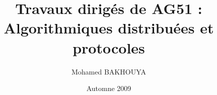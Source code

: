 \documentclass[a4paper]{report}
\title{Travaux dirigés de AG51 : Algorithmiques distribuées et protocoles}
\author{Mohamed BAKHOUYA}
\date{Automne 2009}
\begin{document}
\large
\maketitle
\tableofcontents



\end{document}
